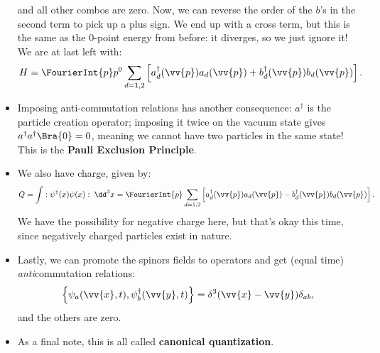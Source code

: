 \begin{itemize}
\begin{equation}
            \end{equation}
            and all other combos are zero.
            Now, we can reverse the order of the $b$'s in the second term to pick up a plus sign. We end up with a cross term, but this is the same as the 0-point energy from before: it diverges, so we just ignore it! We are at last left with:
            \begin{equation}
                H = \FourierInt{p} p^0 \sum_{d=1,2} \left[ a^{\dagger}_d(\vv{p})a_d(\vv{p}) + b^{\dagger}_d(\vv{p})b_d(\vv{p}) \right].
            \end{equation}
        \item Imposing anti-commutation relations has another consequence: $a^{\dagger}$ is the particle creation operator; imposing it twice on the vacuum state gives $a^{\dagger}a^{\dagger} \Bra{0} = 0$, meaning we cannot have two particles in the same state! This is the \textbf{Pauli Exclusion Principle}.
        \item We also have charge, given by:
            \begin{equation}
                Q = \int :\psi^{\dagger}(x)\psi(x): \;\dd^3x = \FourierInt{p} \sum_{d=1,2} \left[ a^{\dagger}_d(\vv{p})a_d(\vv{p}) - b^{\dagger}_d(\vv{p})b_d(\vv{p}) \right].
            \end{equation}
            We have the possibility for negative charge here, but that's okay this time, since negatively charged particles exist in nature.
        \item Lastly, we can promote the spinors fields to operators and get (equal time) \textit{anti}commutation relations:
            \begin{equation}
                \left\{ \psi_a(\vv{x},t),\psi^{\dagger}_b(\vv{y},t) \right\} = \delta^3(\vv{x}-\vv{y})\delta_{ab},\label{SpinorAnticommRels}
            \end{equation}
            and the others are zero.
        \item As a final note, this is all called \textbf{canonical quantization}.
\end{itemize}
